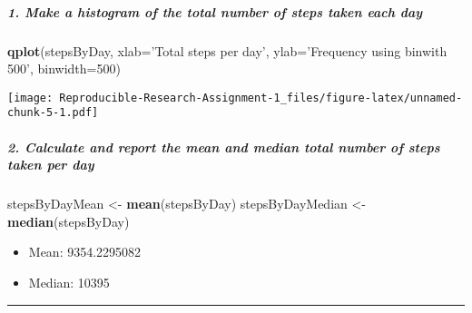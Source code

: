 \documentclass[]{article}
\newenvironment{Shaded}{\begin{snugshade}}{\end{snugshade}}
\newcommand{\DataTypeTok}[1]{\textcolor[rgb]{0.13,0.29,0.53}{#1}}
\newcommand{\DecValTok}[1]{\textcolor[rgb]{0.00,0.00,0.81}{#1}}
\newcommand{\KeywordTok}[1]{\textcolor[rgb]{0.13,0.29,0.53}{\textbf{#1}}}
\newcommand{\NormalTok}[1]{#1}
\newcommand{\OperatorTok}[1]{\textcolor[rgb]{0.81,0.36,0.00}{\textbf{#1}}}
\newcommand{\OtherTok}[1]{\textcolor[rgb]{0.56,0.35,0.01}{#1}}
\newcommand{\StringTok}[1]{\textcolor[rgb]{0.31,0.60,0.02}{#1}}
\providecommand{\tightlist}{%
  \setlength{\itemsep}{0pt}\setlength{\parskip}{0pt}}
\let\oldsubparagraph\subparagraph
\renewcommand{\subparagraph}[1]{\oldsubparagraph{#1}\mbox{}}
\begin{document}
\begin{Shaded}
\end{Shaded}

\hypertarget{make-a-histogram-of-the-total-number-of-steps-taken-each-day}{%
\subparagraph{1. Make a histogram of the total number of steps taken
each
day}\label{make-a-histogram-of-the-total-number-of-steps-taken-each-day}}

\begin{Shaded}
\begin{Highlighting}[]
\KeywordTok{qplot}\NormalTok{(stepsByDay, }\DataTypeTok{xlab=}\StringTok{'Total steps per day'}\NormalTok{, }\DataTypeTok{ylab=}\StringTok{'Frequency using binwith 500'}\NormalTok{, }\DataTypeTok{binwidth=}\DecValTok{500}\NormalTok{)}
\end{Highlighting}
\end{Shaded}

\texttt{[image: Reproducible-Research-Assignment-1\_files/figure-latex/unnamed-chunk-5-1.pdf]}

\hypertarget{calculate-and-report-the-mean-and-median-total-number-of-steps-taken-per-day}{%
\subparagraph{2. Calculate and report the mean and median total number
of steps taken per
day}\label{calculate-and-report-the-mean-and-median-total-number-of-steps-taken-per-day}}

\begin{Shaded}
\begin{Highlighting}[]
\NormalTok{stepsByDayMean <-}\StringTok{ }\KeywordTok{mean}\NormalTok{(stepsByDay)}
\NormalTok{stepsByDayMedian <-}\StringTok{ }\KeywordTok{median}\NormalTok{(stepsByDay)}
\end{Highlighting}
\end{Shaded}

\begin{itemize}
\tightlist
\item
  Mean: 9354.2295082
\item
  Median: 10395
\end{itemize}

\begin{center}\rule{0.5\linewidth}{\linethickness}\end{center}
\end{document}
